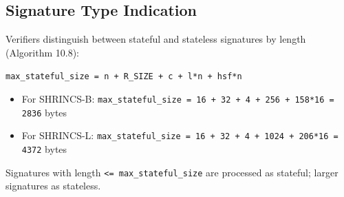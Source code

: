 \subsection{Signature Type Indication}

Verifiers distinguish between stateful and stateless signatures by length (Algorithm 10.8):
\begin{center}
    \texttt{max\_stateful\_size = n + R\_SIZE + c + l*n + hsf*n}
\end{center}
\begin{itemize}
    \item For SHRINCS-B: \texttt{max\_stateful\_size = 16 + 32 + 4 + 256 + 158*16 = 2836} bytes
    \item For SHRINCS-L: \texttt{max\_stateful\_size = 16 + 32 + 4 + 1024 + 206*16 = 4372} bytes
\end{itemize}

Signatures with length \texttt{<= max\_stateful\_size} are processed as stateful; larger signatures as stateless.